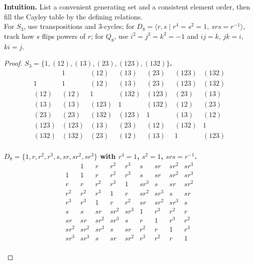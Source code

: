 \documentclass[12pt]{article}
\theoremstyle{definition}
\begin{document}
\dotfill

\noindent\textbf{Intuition.}
List a convenient generating set and a consistent element order, then fill the Cayley table by the defining relations.\\
For $S_3$, use transpositions and 3-cycles; for $D_8=\langle r,s\mid r^4=s^2=1,\ srs=r^{-1}\rangle$, track how $s$ flips powers of $r$; for $Q_8$, use $i^2=j^2=k^2=-1$ and $ij=k$, $jk=i$, $ki=j$.\\

\dotfill

\begin{proof}
\noindent\textbf{$S_3=\{1,(12),(13),(23),(123),(132)\}$.}\\[-0.5em]

\[
\begin{array}{c|cccccc}
      & 1 & (12) & (13) & (23) & (123) & (132)\\\hline
1     & 1 & (12) & (13) & (23) & (123) & (132)\\
(12)  & (12) & 1 & (132) & (123) & (23) & (13)\\
(13)  & (13) & (123) & 1 & (132) & (12) & (23)\\
(23)  & (23) & (132) & (123) & 1 & (13) & (12)\\
(123) & (123) & (13) & (23) & (12) & (132) & 1\\
(132) & (132) & (23) & (12) & (13) & 1 & (123)
\end{array}
\]\\

\noindent\textbf{$D_8=\{1,r,r^2,r^3,s,sr,sr^2,sr^3\}$ with $r^4=1$, $s^2=1$, $srs=r^{-1}$.}\\[-0.5em]

\[
\begin{array}{c|cccccccc}
      & 1 & r & r^2 & r^3 & s & sr & sr^2 & sr^3\\\hline
1     & 1 & r & r^2 & r^3 & s & sr & sr^2 & sr^3\\
r     & r & r^2 & r^3 & 1 & sr^3 & s & sr & sr^2\\
r^2   & r^2 & r^3 & 1 & r & sr^2 & sr^3 & s & sr\\
r^3   & r^3 & 1 & r & r^2 & sr & sr^2 & sr^3 & s\\
s     & s & sr & sr^2 & sr^3 & 1 & r^3 & r^2 & r\\
sr    & sr & sr^2 & sr^3 & s & r & 1 & r^3 & r^2\\
sr^2  & sr^2 & sr^3 & s & sr & r^2 & r & 1 & r^3\\
sr^3  & sr^3 & s & sr & sr^2 & r^3 & r^2 & r & 1
\end{array}
\]\\


\end{proof}
\end{document}
